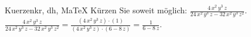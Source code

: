 \begin{MAufgabe}{Kuerzen}{kr, dh, MaTeX}
K\"urzen Sie soweit m\"oglich: $\frac{4\, x^2\, y^3\, z}{24\, x^2\, y^3\, z - 32\, x^2\, y^3\, z^2}$.\\ 
\ifLsg\MLoesung
\quad $\frac{4\, x^2\, y^3\, z}{24\, x^2\, y^3\, z - 32\, x^2\, y^3\, z^2}=\frac{(4\, x^2\, y^3\, z)\cdot(1)}{(4\, x^2\, y^3\, z)\cdot(6 - 8\, z)}=\frac{1}{6 - 8\, z}$.\else\relax\fi
 \end{MAufgabe}